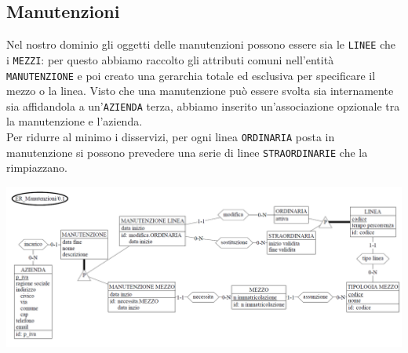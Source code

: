 \documentclass[12pt,a4paper]{report}
\begin{document}
\subsection{Manutenzioni}
Nel nostro dominio gli oggetti delle manutenzioni possono essere sia le \texttt{LINEE} che i \texttt{MEZZI}: per questo abbiamo raccolto gli attributi comuni nell'entità \texttt{MANUTENZIONE} e poi creato una gerarchia totale ed esclusiva per specificare il mezzo o la linea.
Visto che una manutenzione può essere svolta sia internamente sia affidandola a un'\texttt{AZIENDA} terza, abbiamo inserito un'associazione opzionale tra la manutenzione e l'azienda. \\
Per ridurre al minimo i disservizi, per ogni linea \texttt{ORDINARIA} posta in manutenzione si possono prevedere una serie di linee \texttt{STRAORDINARIE} che la rimpiazzano. \\
\begin{centering}
\includegraphics[width=1.0\textwidth]{prog_conc/Manutenzioni}
\end{centering}
\end{document}
